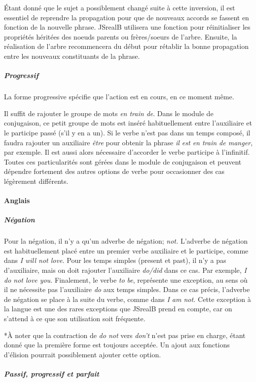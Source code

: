 \documentclass[11pt]{article} %
\newcommand{\system}[1]{\textsf{#1}}
\newcommand{\JSB}{\system{JSrealB}}
\begin{document}
Étant donné que le sujet a possiblement changé suite à
cette inversion, il est essentiel de reprendre la propagation
pour que de nouveaux accords se fassent en fonction de la nouvelle
phrase. \JSB{} utilisera une fonction pour réinitialiser les propriétés
héritées des noeuds parents ou frères/soeurs de l'arbre. Ensuite,
la réalisation de l'arbre recommencera du début pour rétablir la bonne
propagation entre les nouveaux constituants de la phrase.

\subparagraph{Progressif}

La forme progressive spécifie que l'action est en cours, en ce moment même. 

Il suffit de rajouter le groupe de
mots \emph{en train de}. Dans le module de conjugaison, ce petit groupe de
mots est inséré habituellement entre l'auxiliaire et le participe
passé (s'il y en a un). Si le verbe n'est pas dans un temps composé,
il faudra rajouter un auxiliaire \emph{être }pour obtenir la phrase
\emph{il est en train de manger}, par exemple. Il est aussi alors
nécessaire d'accorder le verbe participe à l'infinitif. Toutes ces
particularités sont gérées dans le module de conjugaison et peuvent
dépendre fortement des autres options de verbe pour occasionner des
cas légèrement différents.

\paragraph{Anglais}

\subparagraph{Négation}

Pour la négation, il n'y a qu'un adverbe de négation; 
\emph{not. }L'adverbe de négation est habituellement placé entre un
premier verbe auxiliaire et le participe, comme dans \emph{I will
not love. }Pour les temps simples (present et past), il n'y a pas d'auxiliaire,
mais on doit rajouter l'auxiliaire \emph{do/did} dans ce cas. Par
exemple, \emph{I do not love you. }Finalement, le verbe \emph{to be},
représente une exception, au sens où il ne nécessite pas l'auxiliaire
\emph{do }aux temps simples. Dans ce cas précis, l'adverbe de négation
se place à la suite du verbe, comme dans \emph{I am not.} Cette exception
à la langue est une des rares exceptions que \JSB{} prend en compte,
car on s'attend à ce que son utilisation soit fréquente.

{*}À noter que la contraction de \emph{do not }vers \emph{don't} n'est
pas prise en charge, étant donné que la première forme est toujours
acceptée. Un ajout aux fonctions d'élision pourrait possiblement ajouter
cette option.
\subparagraph{Passif, progressif et parfait}
\end{document}
